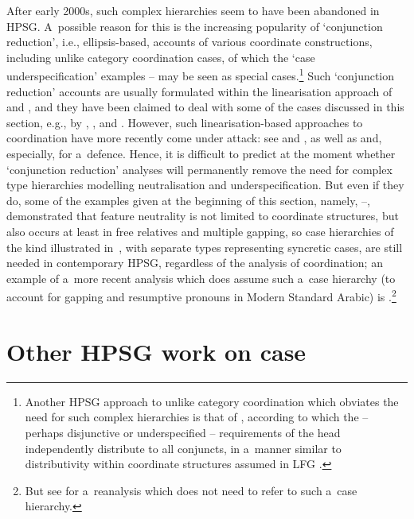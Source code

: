 \documentclass[output=paper]{langsci/langscibook}
\begin{document}
After early 2000s, such complex  hierarchies seem to have been abandoned in HPSG\@.  A~possible reason for this is the increasing popularity of ‘conjunction reduction’, i.e., ellipsis-based, accounts of various coordinate constructions, including unlike category coordination cases, of which the ‘case underspecification’ examples – may be seen as special cases.\footnote{Another HPSG approach to unlike category coordination which obviates the need for such complex hierarchies is that of \citealt{yata:04}, according to which the – perhaps disjunctive or underspecified – requirements of the head independently distribute to all conjuncts, in a~manner similar to distributivity within coordinate structures assumed in LFG \citep{DK2000a,dal:kin:sad:09,prz:pat:12a}.}  Such ‘conjunction reduction’ accounts are usually formulated within the linearisation approach of \citealt{Reape92a,Reape94a} and \citealt{Kathol95a}, and they have been claimed to deal with some of the cases discussed in this section, e.g., by \citealt{Crysmann2003c}, \citealt{BS2004a}, and \citealt{chav:06,chav:08}.  However, such linearisation-based approaches to coordination have more recently come under attack: see \citealt{levi:11} and \citealt{kub:lev:15}, as well as \citealt{yata:12,yata:16} and, especially, \citealt{yat:wai:18} for a~defence.  Hence, it is difficult to predict at the moment whether ‘conjunction reduction’ analyses will permanently remove the need for complex type hierarchies modelling neutralisation and underspecification.  But even if they do, some of the examples given at the beginning of this section, namely, –, demonstrated that feature neutrality is not limited to coordinate structures, but also occurs at least in free relatives and multiple gapping, so case hierarchies of the kind illustrated in~, with separate types representing syncretic cases, are still needed in contemporary HPSG, regardless of the analysis of coordination; an example of a~more recent analysis which does assume such a~case hierarchy (to account for gapping and resumptive pronouns in Modern Standard Arabic) is \citealt{AB2013a-u}.\footnote{But see \citealt{crys:17} for a~reanalysis which does not need to refer to such a~case hierarchy.}



\section{Other HPSG work on case}
\label{sec:case:other}
\end{document}
